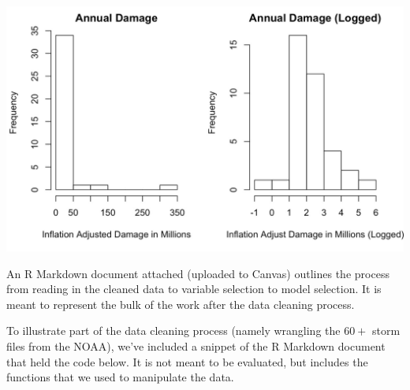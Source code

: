 \documentclass[10pt,]{article}
\begin{document}
\includegraphics{./images/damage_trans.jpeg}

An R Markdown document attached (uploaded to Canvas) outlines the
process from reading in the cleaned data to variable selection to model
selection. It is meant to represent the bulk of the work after the data
cleaning process.

To illustrate part of the data cleaning process (namely wrangling the
\(60+\) storm files from the NOAA), we've included a snippet of the R
Markdown document that held the code below. It is not meant to be
evaluated, but includes the functions that we used to manipulate the
data.
\end{document}
